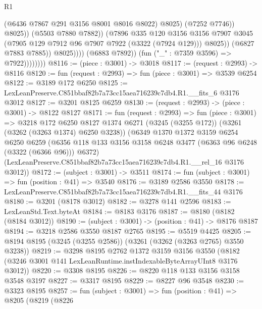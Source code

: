 \begin{lexlean}{R1}
\begin{coremodule}
                                          (@6436 @7867 @291 @3156 @8001 @8016 @8022)
                                          @8025)
                                        (@7252 @7746))
                                      @8025))
                                  (@5503 @7880 @7882))
                                (@7896
                                  @335
                                  @120
                                  @3156
                                  @3156
                                  @7907
                                  @3045
                                  (@7905 @129 @7912 @96 @7907 @7922 (@3322 (@7924 @129)))
                                  @8025))
                              (@6827 @7883 @7885))
                            @8025))))
                    (@6883 @7892))
                  (fun ("_" : @7359 @3596) => @7922))))))))
@8116 := (piece : @3001) -> @3018
@8117 := (request : @2993) -> @8116
@8120 := fun (request : @2993) => fun (piece : @3001) => @3539 @6254
@8122 := @3189 @172 @6250
@8125 := LexLeanPreserve.C851bbaf82b7a73cc15aea716239c7db4.R1.__fits_6 @3176 @3012
@8127 := @3201 @8125 @6259
@8130 := (request : @2993) -> (piece : @3001) -> @8122 @8127
@8171 := fun (request : @2993) =>
  fun (piece : @3001) =>
  @3218
    @172
    @6250
    @8127
    @1374
    @6271
    (@3245 (@3255 @172))
    (@3261 (@3262 (@3263 @1374) @6250 @3238))
    (@6349
      @1370
      @1372
      @3159
      @6254
      @6250
      @6259
      (@6356 @118 @133 @3156 @3158 @6248 @3477 (@6363 @96 @6248 (@3322 (@6366 @96))) @6372)
      (LexLeanPreserve.C851bbaf82b7a73cc15aea716239c7db4.R1.__rel_16 @3176 @3012))
@8172 := (subject : @3001) -> @3511
@8174 := fun (subject : @3001) => fun (position : @41) => @3540
@8176 := @3189 @2586 @3550
@8178 := LexLeanPreserve.C851bbaf82b7a73cc15aea716239c7db4.R1.__fits_44 @3176
@8180 := @3201 (@8178 @3012)
@8182 := @3278 @141 @2596
@8183 := LexLeanStd.Text.byteAt
@8184 := @8183 @3176
@8187 := @8180 (@8182 (@8184 @3012))
@8190 := (subject : @3001) -> (position : @41) -> @8176 @8187
@8194 := @3218 @2586 @3550 @8187 @2765
@8195 := @5519 @4425
@8205 := @8194 @8195 (@3245 (@3255 @2586)) (@3261 (@3262 (@3263 @2765) @3550 @3238))
@8219 := @3298
    @8195
    @2762
    @1372
    @3159
    @3156
    @3550
    (@8182 (@3246 @3001 @141 LexLeanRuntime.instIndexableByteArrayUInt8 @3176 @3012))
@8220 := @3308 @8195
@8226 := @8220 @118 @133 @3156 @3158 @3548 @3197
@8227 := @3317 @8195
@8229 := @8227 @96 @3548
@8230 := @3323 @8195
@8257 := fun (subject : @3001) =>
  fun (position : @41) =>
  @8205
    (@8219
      (@8226

\end{coremodule}
\end{lexlean}
